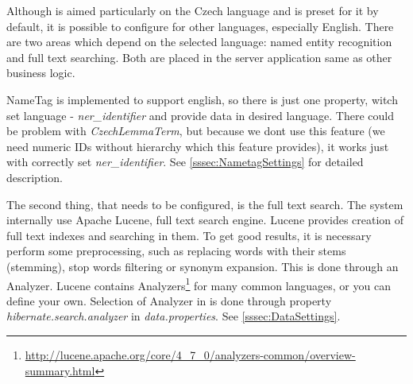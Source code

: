 
Although \textan{} is aimed particularly on the Czech language and is preset for
it by default, it is possible to configure \textan{} for other languages, especially
English. There are two areas which depend on the selected language: named entity
recognition and full text searching. Both are placed in the server application
same as other business logic.

NameTag is implemented to support english, so there is just one property, witch set language  - {\it ner\_identifier}
and provide data in desired language. There could be problem with {\it CzechLemmaTerm}, but because we dont use this feature
(we need numeric IDs without hierarchy which this feature provides), it works just with correctly set {\it ner\_identifier}.
See \ref{sssec:NametagSettings} for detailed description.

The second thing, that needs to be configured, is the full text search. The system
internally use Apache Lucene, full text search engine. Lucene provides creation
of full text indexes and searching in them. To get good results, it is necessary
perform some preprocessing, such as replacing words with their stems (stemming),
stop words filtering or synonym expansion. This is done through an Analyzer. Lucene
contains Analyzers\footnote{\url{http://lucene.apache.org/core/4_7_0/analyzers-common/overview-summary.html}}
for many common languages, or you can define your own. Selection of Analyzer in 
\textan{} is done through property \emph{hibernate.search.analyzer} in \emph{data.properties}.
See \ref{sssec:DataSettings}.

